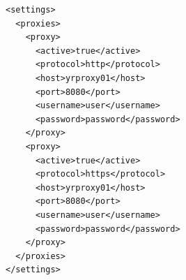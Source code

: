 \documentclass[small,algo]{dushClass} %
\begin{document}
\begin{lstlisting}
<settings>
  <proxies>  
    <proxy>
      <active>true</active>
      <protocol>http</protocol>
      <host>yrproxy01</host>
      <port>8080</port>
      <username>user</username>
      <password>password</password>
    </proxy>
    <proxy>
      <active>true</active>
      <protocol>https</protocol>
      <host>yrproxy01</host>
      <port>8080</port>
      <username>user</username>
      <password>password</password>
    </proxy>    
  </proxies>  
</settings>

\end{lstlisting}
\end{document}
